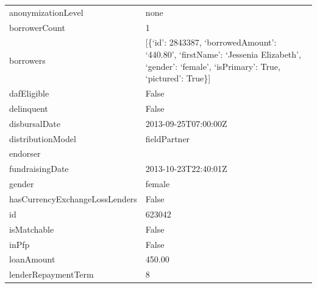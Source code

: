 \begin{longtable}{|p{}|p{}|}
    anonymizationLevel                   & none                                                                \\
    borrowerCount                        & 1                                                                   \\
    borrowers                            & {[}\{`id': 2843387, `borrowedAmount': `440.80', `firstName':
    `Jessenia Elizabeth', `gender': `female', `isPrimary': True, `pictured':
    True\}{]}                                                                                                  \\
    dafEligible                          & False                                                               \\
    delinquent                           & False                                                               \\
    disbursalDate                        & 2013-09-25T07:00:00Z                                                \\
    distributionModel                    & fieldPartner                                                        \\
    endorser                             &                                                                     \\
    fundraisingDate                      & 2013-10-23T22:40:01Z                                                \\
    gender                               & female                                                              \\
    hasCurrencyExchangeLossLenders       & False                                                               \\
    id                                   & 623042                                                              \\
    isMatchable                          & False                                                               \\
    inPfp                                & False                                                               \\
    loanAmount                           & 450.00                                                              \\
    lenderRepaymentTerm                  & 8                                                                   \\

\end{longtable}
